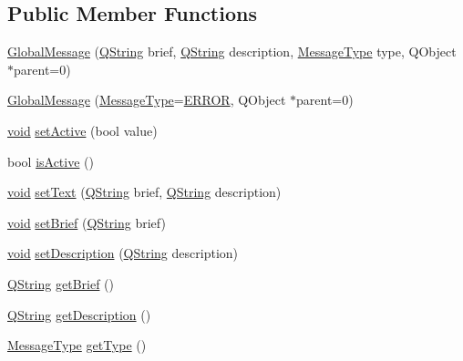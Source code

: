 \subsection*{\-Public \-Member \-Functions}
\begin{DoxyCompactItemize}
\item 
\hyperlink{group___core_plugin_ga4221065546e0e2ac93ead9ecc246c70f}{\-Global\-Message} (\hyperlink{group___u_a_v_objects_plugin_gab9d252f49c333c94a72f97ce3105a32d}{\-Q\-String} brief, \hyperlink{group___u_a_v_objects_plugin_gab9d252f49c333c94a72f97ce3105a32d}{\-Q\-String} description, \hyperlink{group___core_plugin_ga51bd6651e9cc7b45aeaff9bd5991be3d}{\-Message\-Type} type, \-Q\-Object $\ast$parent=0)
\item 
\hyperlink{group___core_plugin_ga695a4804697eca5a8ed43aa5de802b4d}{\-Global\-Message} (\hyperlink{group___core_plugin_ga51bd6651e9cc7b45aeaff9bd5991be3d}{\-Message\-Type}=\hyperlink{group___core_plugin_gga51bd6651e9cc7b45aeaff9bd5991be3da1b81696793f3033d6741d6b8a59ac60a}{\-E\-R\-R\-O\-R}, \-Q\-Object $\ast$parent=0)
\item 
\hyperlink{group___u_a_v_objects_plugin_ga444cf2ff3f0ecbe028adce838d373f5c}{void} \hyperlink{group___core_plugin_gaab47836803fae367ea72f40320089d28}{set\-Active} (bool value)
\item 
bool \hyperlink{group___core_plugin_ga05b5cb5bd16c393a06028e18827e1869}{is\-Active} ()
\item 
\hyperlink{group___u_a_v_objects_plugin_ga444cf2ff3f0ecbe028adce838d373f5c}{void} \hyperlink{group___core_plugin_gaf3383d5bfaeb02ba674ed8d30b1fa762}{set\-Text} (\hyperlink{group___u_a_v_objects_plugin_gab9d252f49c333c94a72f97ce3105a32d}{\-Q\-String} brief, \hyperlink{group___u_a_v_objects_plugin_gab9d252f49c333c94a72f97ce3105a32d}{\-Q\-String} description)
\item 
\hyperlink{group___u_a_v_objects_plugin_ga444cf2ff3f0ecbe028adce838d373f5c}{void} \hyperlink{group___core_plugin_ga3e32cefcff3e4b72543ecafccc106f0b}{set\-Brief} (\hyperlink{group___u_a_v_objects_plugin_gab9d252f49c333c94a72f97ce3105a32d}{\-Q\-String} brief)
\item 
\hyperlink{group___u_a_v_objects_plugin_ga444cf2ff3f0ecbe028adce838d373f5c}{void} \hyperlink{group___core_plugin_gaf3d82a250c85cf4fc446962fd4755f9b}{set\-Description} (\hyperlink{group___u_a_v_objects_plugin_gab9d252f49c333c94a72f97ce3105a32d}{\-Q\-String} description)
\item 
\hyperlink{group___u_a_v_objects_plugin_gab9d252f49c333c94a72f97ce3105a32d}{\-Q\-String} \hyperlink{group___core_plugin_ga26d2a51122184b81f51d6ed401efc997}{get\-Brief} ()
\item 
\hyperlink{group___u_a_v_objects_plugin_gab9d252f49c333c94a72f97ce3105a32d}{\-Q\-String} \hyperlink{group___core_plugin_gae6a7c0268d0400189aab24dfe2a85c60}{get\-Description} ()
\item 
\hyperlink{group___core_plugin_ga51bd6651e9cc7b45aeaff9bd5991be3d}{\-Message\-Type} \hyperlink{group___core_plugin_gab882a1abe22056db73914f652e329048}{get\-Type} ()
\end{DoxyCompactItemize}


